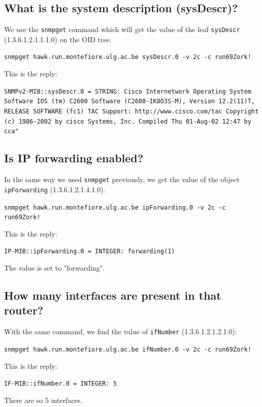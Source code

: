 \documentclass[a4paper,titlepage]{article}
\begin{document}
	\subsection{What is the system description (sysDescr)?}
We use the \texttt{snmpget} command which will get the value of the leaf \texttt{sysDescr} (1.3.6.1.2.1.1.1.0) on the OID tree.
\begin{center}
	\texttt{snmpget hawk.run.montefiore.ulg.ac.be sysDescr.0 -v 2c -c run69Zork!}
\end{center}
This is the reply: 
\begin{center}
	\texttt{SNMPv2-MIB::sysDescr.0 = STRING: Cisco Internetwork Operating System Software 
IOS (tm) C2600 Software (C2600-IK8O3S-M), Version 12.2(11)T,  RELEASE SOFTWARE (fc1)
TAC Support: http://www.cisco.com/tac
Copyright (c) 1986-2002 by cisco Systems, Inc.
Compiled Thu 01-Aug-02 12:47 by cca"}
\end{center}


	\subsection{Is IP forwarding enabled?}
In the same way we used \texttt{snmpget} previously, we get the value of the object \texttt{ipForwarding} (1.3.6.1.2.1.4.1.0).
\begin{center}
	\texttt{snmpget hawk.run.montefiore.ulg.ac.be ipForwarding.0 -v 2c -c run69Zork!}
\end{center}
This is the reply: 
\begin{center}
	\texttt{IP-MIB::ipForwarding.0 = INTEGER: forwarding(1)}
\end{center}
The value is set to "forwarding".

	\subsection{How many interfaces are present in that router?}
With the same command, we find the value of \texttt{ifNumber} (1.3.6.1.2.1.2.1.0): 
\begin{center}
	\texttt{snmpget hawk.run.montefiore.ulg.ac.be ifNumber.0 -v 2c -c run69Zork!}
\end{center}
This is the reply: 
\begin{center}
	\texttt{IF-MIB::ifNumber.0 = INTEGER: 5}
\end{center}
There are so 5 interfaces.

\paragraph{}
\end{document}

